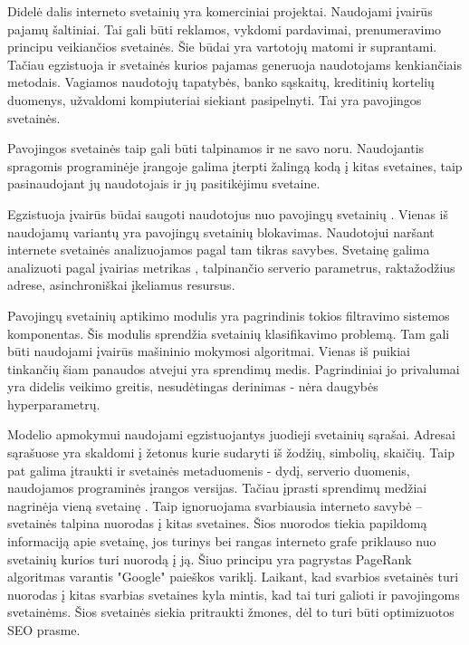 

Didelė dalis interneto svetainių yra komerciniai projektai. Naudojami įvairūs pajamų šaltiniai.
Tai gali būti reklamos, vykdomi pardavimai, prenumeravimo principu veikiančios svetainės.
Šie būdai yra vartotojų matomi ir suprantami. Tačiau egzistuoja ir svetainės kurios pajamas
generuoja naudotojams kenkiančiais metodais. Vagiamos naudotojų tapatybės, banko sąskaitų, kreditinių kortelių
duomenys, užvaldomi kompiuteriai siekiant pasipelnyti. Tai yra pavojingos svetainės.

Pavojingos svetainės taip gali būti talpinamos ir ne savo noru.
Naudojantis spragomis programinėje įrangoje galima įterpti žalingą kodą į kitas svetaines,
taip pasinaudojant jų naudotojais ir jų pasitikėjimu svetaine.

Egzistuoja įvairūs būdai saugoti naudotojus nuo pavojingų svetainių \cite{trees}.
Vienas iš naudojamų variantų yra pavojingų svetainių blokavimas.
Naudotojui naršant internete svetainės analizuojamos pagal tam tikras savybes.
Svetainę galima analizuoti pagal įvairias metrikas \cite{tangled},
talpinančio serverio parametrus, raktažodžius adrese, asinchroniškai įkeliamus resursus.

Pavojingų svetainių aptikimo modulis yra pagrindinis tokios filtravimo sistemos komponentas.
Šis modulis sprendžia svetainių klasifikavimo problemą. Tam gali būti naudojami įvairūs mašininio mokymosi algoritmai.
Vienas iš puikiai tinkančių šiam panaudos atvejui \cite{trees} yra sprendimų medis.
Pagrindiniai jo privalumai yra didelis veikimo greitis, nesudėtingas derinimas - nėra daugybės hyperparametrų.

Modelio apmokymui naudojami egzistuojantys juodieji svetainių sąrašai.
Adresai sąrašuose yra skaldomi į žetonus kurie sudaryti iš žodžių, simbolių, skaičių.
Taip pat galima įtraukti ir svetainės metaduomenis - dydį, serverio duomenis, naudojamos programinės įrangos versijas.
Tačiau įprasti sprendimų medžiai nagrinėja vieną svetainę \cite{trees}.
Taip ignoruojama svarbiausia interneto savybė -- svetainės talpina nuorodas į kitas svetaines.
Šios nuorodos tiekia papildomą informaciją apie svetainę,
jos turinys bei rangas interneto grafe priklauso nuo svetainių kurios turi nuorodą į ją.
Šiuo principu yra pagrystas PageRank algoritmas \cite{pagerank} varantis "Google" paieškos variklį.
Laikant, kad svarbios svetainės turi nuorodas į kitas svarbias svetaines kyla mintis,
kad tai turi galioti ir pavojingoms svetainėms.
Šios svetainės siekia pritraukti žmones, dėl to turi būti optimizuotos SEO prasme.


